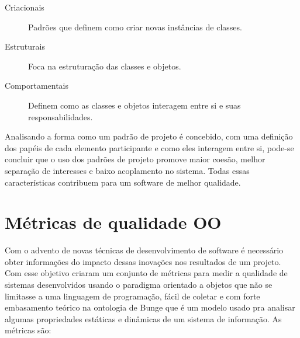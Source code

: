\begin{description}
\item[Criacionais] Padrões que definem como criar novas instâncias de classes.
\item[Estruturais] Foca na estruturação das classes e objetos.
\item[Comportamentais] Definem como as classes e objetos interagem entre si e
suas responsabilidades.
\end{description}
Analisando a forma como um padrão de projeto é concebido, com uma definição
dos papéis de cada elemento participante e como eles interagem entre si,
pode-se concluir que o uso dos padrões de projeto promove maior coesão, melhor
separação de interesses e baixo acoplamento no sistema. Todas essas
características contribuem para um software de melhor qualidade.




\section{Métricas de qualidade OO}
\label{sec:metrics}




Com o advento de novas técnicas de desenvolvimento de software é necessário
obter informações do impacto dessas inovações nos resultados de um projeto. Com
esse objetivo  criaram um conjunto de métricas para
medir a qualidade de sistemas desenvolvidos usando o paradigma orientado a
objetos que não se limitasse a uma linguagem de programação, fácil de coletar e
com forte embasamento teórico na ontologia de Bunge que é um modelo usado pra
analisar algumas propriedades estáticas e dinâmicas de um sistema de
informação\cite{WandWeber}. As métricas são:




